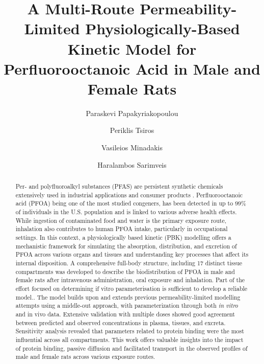 \documentclass[preprint,12pt,authoryear]{elsarticle}
\begin{document}
\begin{frontmatter}
\title{A Multi-Route Permeability-Limited Physiologically-Based Kinetic Model for Perfluorooctanoic Acid in Male and Female Rats} 
\author{Paraskevi Papakyriakopoulou}
\author{Periklis Tsiros}

\author{Vasileios Minadakis }

\author{Haralambos Sarimveis}
\begin{abstract}
Per- and polyfluoroalkyl substances (PFAS) are persistent synthetic chemicals extensively used in industrial applications and consumer products .  Perfluorooctanoic acid (PFOA) being one of the most studied congeners, has been detected in up to $99\%$ of individuals in the U.S. population and is linked to various adverse health effects. While ingestion of contaminated food and water is the primary exposure route, inhalation also contributes to human PFOA intake, particularly in occupational settings. In this context, a physiologically based kinetic (PBK) modelling offers a mechanistic framework for simulating the absorption, distribution, and excretion of PFOA across various organs and tissues and understanding key processes that affect its internal disposition. A comprehensive full-body structure, including 17 distinct tissue compartments was developed to describe the biodistribution of PFOA in male and female rats after intravenous administration, oral exposure and inhalation. Part of the effort focused on determining if vitro parameterisation is sufficient to develop a reliable model.. The model builds upon and extends previous permeability-limited modelling attempts using a middle-out approach, with parameterization through both \textit{in vitro} and in vivo data. Extensive validation with multiple doses showed good agreement between predicted and observed concentrations in plasma, tissues, and excreta. Sensitivity analysis revealed that parameters related to protein binding were the most influential across all compartments. This work offers valuable insights into the impact of protein binding, passive diffusion and facilitated transport in the observed profiles of male and female rats across various exposure routes.


\end{abstract}
\end{frontmatter}
\end{document}
